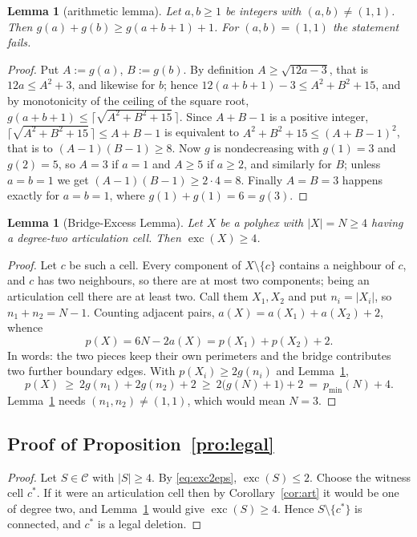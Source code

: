 \documentclass[11pt]{article}
\theoremstyle{plain}
\newtheorem{lemma}[theorem]{Lemma}
\theoremstyle{definition}
\theoremstyle{remark}
\newcommand{\sm}{\setminus}
\DeclareMathOperator{\exc}{exc}
\begin{document}
\begin{lemma}[arithmetic lemma]\label{lem:arith}
Let \(a,b\ge1\) be integers with \((a,b)\neq(1,1)\). Then
\(g(a)+g(b)\ge g(a+b+1)+1\). For \((a,b)=(1,1)\) the statement fails.
\end{lemma}

\begin{proof}
Put \(A:=g(a)\), \(B:=g(b)\). By definition \(A\ge\sqrt{12a-3}\), that is
\(12a\le A^{2}+3\), and likewise for \(b\); hence
\(12(a+b+1)-3\le A^{2}+B^{2}+15\), and by monotonicity of the ceiling of the square root,
\(g(a+b+1)\le\lceil\sqrt{A^{2}+B^{2}+15}\,\rceil\). Since \(A+B-1\) is a positive integer,
\(\lceil\sqrt{A^{2}+B^{2}+15}\,\rceil\le A+B-1\) is equivalent to
\(A^{2}+B^{2}+15\le(A+B-1)^{2}\), that is to \((A-1)(B-1)\ge8\). Now \(g\) is nondecreasing
with \(g(1)=3\) and \(g(2)=5\), so \(A=3\) if \(a=1\) and \(A\ge5\) if \(a\ge2\), and
similarly for \(B\); unless \(a=b=1\) we get \((A-1)(B-1)\ge2\cdot4=8\). Finally
\(A=B=3\) happens exactly for \(a=b=1\), where \(g(1)+g(1)=6=g(3)\).
\end{proof}

\begin{lemma}[Bridge-Excess Lemma]\label{lem:bridge-exc}
Let \(X\) be a polyhex with \(|X|=N\ge4\) having a degree-two articulation cell. Then
\(\exc(X)\ge4\).
\end{lemma}

\begin{proof}
Let \(c\) be such a cell. Every component of \(X\sm\{c\}\) contains a neighbour of \(c\),
and \(c\) has two neighbours, so there are at most two components; being an articulation
cell there are at least two. Call them \(X_{1},X_{2}\) and put \(n_{i}=|X_{i}|\), so
\(n_{1}+n_{2}=N-1\). Counting adjacent pairs, \(a(X)=a(X_{1})+a(X_{2})+2\), whence
\[
   p(X)=6N-2a(X)=p(X_{1})+p(X_{2})+2 .
\]
In words: the two pieces keep their own perimeters and the bridge contributes two further
boundary edges. With \(p(X_{i})\ge2g(n_{i})\) and Lemma~\ref{lem:arith},
\[
   p(X)\ \ge\ 2g(n_{1})+2g(n_{2})+2\ \ge\ 2\bigl(g(N)+1\bigr)+2\ =\ p_{\min}(N)+4 .
\]
Lemma~\ref{lem:arith} needs \((n_{1},n_{2})\neq(1,1)\), which would mean \(N=3\).
\end{proof}

\subsection{Proof of Proposition~\ref{pro:legal}}\label{sec:11.4}

\begin{proof}
Let \(S\in\mathcal{C}\) with \(|S|\ge4\). By \eqref{eq:exc2eps}, \(\exc(S)\le2\). Choose the
witness cell \(c^{*}\). If it were an articulation cell then by Corollary~\ref{cor:art} it
would be one of degree two, and Lemma~\ref{lem:bridge-exc} would give \(\exc(S)\ge4\). Hence
\(S\sm\{c^{*}\}\) is connected, and \(c^{*}\) is a legal deletion.
\end{proof}
\end{document}
